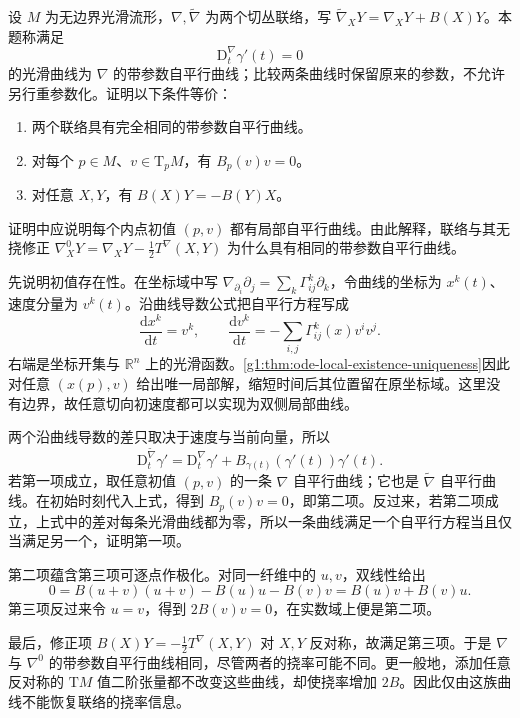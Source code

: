 \begin{exercise}\label{g1:ex:autoparallel-curves-torsion-invisible}
	设 \(M\) 为无边界光滑流形，\(\nabla,\widetilde\nabla\) 为两个切丛联络，写 \(\widetilde\nabla_XY=\nabla_XY+B(X)Y\)。本题称满足
	\[
		\mathrm{D}_t^\nabla\gamma'(t)=0
	\]
	的光滑曲线为 \(\nabla\) 的带参数自平行曲线；比较两条曲线时保留原来的参数，不允许另行重参数化。证明以下条件等价：
	\begin{enumerate}
		\item 两个联络具有完全相同的带参数自平行曲线。
		\item 对每个 \(p\in M\)、\(v\in \mathrm{T}_pM\)，有 \(B_p(v)v=0\)。
		\item 对任意 \(X,Y\)，有 \(B(X)Y=-B(Y)X\)。
	\end{enumerate}
	证明中应说明每个内点初值 \((p,v)\) 都有局部自平行曲线。由此解释，联络与其无挠修正 \(\nabla^0_XY=\nabla_XY-\tfrac12T^\nabla(X,Y)\) 为什么具有相同的带参数自平行曲线。
\end{exercise}
\begin{solution}
	先说明初值存在性。在坐标域中写 \(\nabla_{\partial_i}\partial_j=\sum_k\Gamma^k_{ij}\partial_k\)，令曲线的坐标为 \(x^k(t)\)、速度分量为 \(v^k(t)\)。沿曲线导数公式把自平行方程写成
	\[
		\frac{\mathrm{d}x^k}{\mathrm{d}t}=v^k,\qquad
		\frac{\mathrm{d}v^k}{\mathrm{d}t}
		=-\sum_{i,j}\Gamma^k_{ij}(x)v^iv^j.
	\]
	右端是坐标开集与 \(\mathbb R^n\) 上的光滑函数。\cref{g1:thm:ode-local-existence-uniqueness}因此对任意 \((x(p),v)\) 给出唯一局部解，缩短时间后其位置留在原坐标域。这里没有边界，故任意切向初速度都可以实现为双侧局部曲线。

	两个沿曲线导数的差只取决于速度与当前向量，所以
	\[
		\mathrm{D}_t^{\widetilde\nabla}\gamma'
		=\mathrm{D}_t^\nabla\gamma'+B_{\gamma(t)}(\gamma'(t))\gamma'(t).
	\]
	若第一项成立，取任意初值 \((p,v)\) 的一条 \(\nabla\) 自平行曲线；它也是 \(\widetilde\nabla\) 自平行曲线。在初始时刻代入上式，得到 \(B_p(v)v=0\)，即第二项。反过来，若第二项成立，上式中的差对每条光滑曲线都为零，所以一条曲线满足一个自平行方程当且仅当满足另一个，证明第一项。

	第二项蕴含第三项可逐点作极化。对同一纤维中的 \(u,v\)，双线性给出
	\[
		0=B(u+v)(u+v)-B(u)u-B(v)v=B(u)v+B(v)u.
	\]
	第三项反过来令 \(u=v\)，得到 \(2B(v)v=0\)，在实数域上便是第二项。

	最后，修正项 \(B(X)Y=-\tfrac12T^\nabla(X,Y)\) 对 \(X,Y\) 反对称，故满足第三项。于是 \(\nabla\) 与 \(\nabla^0\) 的带参数自平行曲线相同，尽管两者的挠率可能不同。更一般地，添加任意反对称的 \(\mathrm{T}M\) 值二阶张量都不改变这些曲线，却使挠率增加 \(2B\)。因此仅由这族曲线不能恢复联络的挠率信息。
\end{solution}

